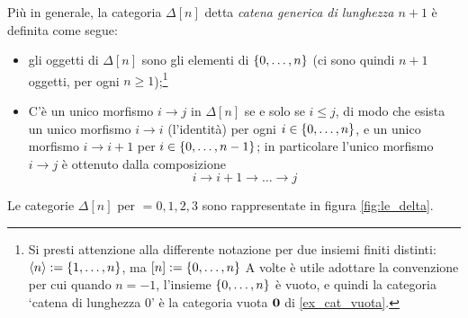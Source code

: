 \begin{example}\label{ex_cat_catena}
	Più in generale, la categoria \(\Delta[n]\) detta \emph{catena generica di lunghezza \(n+1\)} è definita come segue:
	\begin{itemize}
		\item gli oggetti di \(\Delta[n]\) sono gli elementi di \(\{\iter[0]{n}\}\) (ci sono quindi \(n+1\) oggetti, per ogni \(n\ge 1\));\footnote{Si presti attenzione alla differente notazione per due insiemi finiti distinti: \(\bkt n := \{\iter n\}\), ma \([n] := \{\iter [0]n\}\) A volte è utile adottare la convenzione per cui quando \(n=-1\), l'insieme \(\{\iter[0]{n}\}\) è vuoto, e quindi la categoria `catena di lunghezza \(0\)' è la categoria vuota \(\mathbf{0}\) di \ref{ex_cat_vuota}.}
		\item C'è un unico morfismo \(i\to j\) in \(\Delta[n]\) se e solo se \(i\le j\), di modo che esista un unico morfismo \(i\to i\) (l'identità) per ogni \(i\in\{\iter[0]{n}\}\), e un unico morfismo \(i\to i+1\) per \(i\in\{\iter[0]{n-1}\}\); in particolare l'unico morfismo \(i\to j\) è ottenuto dalla composizione
		      \[i\to i+1\to\dots\to j\]
	\end{itemize}
	Le categorie \(\Delta[n]\) per \(=0,1,2,3\) sono rappresentate in figura \ref{fig:le_delta}.
	\begin{figure}[h]
		\begin{center}
\end{center}
\end{figure}
\end{example}
